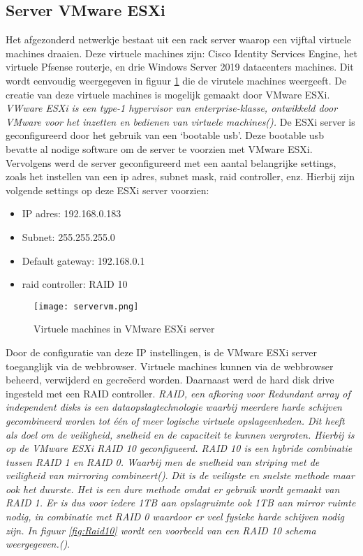 \subsection{Server VMware ESXi}
Het afgezonderd netwerkje bestaat uit een rack server waarop een vijftal virtuele machines draaien. Deze virtuele machines zijn: Cisco Identity Services Engine, het virtuele Pfsense routerje, en drie Windows Server 2019 datacenters machines. Dit wordt eenvoudig weergegeven in figuur \ref{fig:vms} die de virutele machines weergeeft. De creatie van deze virtuele machines is mogelijk gemaakt door VMware ESXi. \textit{VWware ESXi is een type-1 hypervisor van enterprise-klasse, ontwikkeld door VMware voor het inzetten en bedienen van virtuele machines(\cite{VMwareESXI}).} 
\newline
\newline
De ESXi server is geconfigureerd door het gebruik van een ‘bootable usb’. Deze bootable usb bevatte al nodige software om de server te voorzien met VMware ESXi. Vervolgens werd de server geconfigureerd met een aantal belangrijke settings, zoals het instellen van een ip adres, subnet mask, raid controller, enz. Hierbij zijn volgende settings op deze ESXi server voorzien: 

\begin{itemize}
	\item IP adres: 192.168.0.183
	\item Subnet: 255.255.255.0
	\item Default gateway: 192.168.0.1
	\item raid controller: RAID 10
\end{itemize}

\begin{figure}[H]
	\centering
	\texttt{[image: servervm.png]}
	\caption{Virtuele machines in VMware ESXi server}
	\label{fig:vms}
\end{figure}

\newpage
Door de configuratie van deze IP instellingen, is de VMware ESXi server toeganglijk via de webbrowser. Virtuele machines kunnen via de webbrowser beheerd, verwijderd en gecreëerd worden. Daarnaast werd de hard disk drive ingesteld met een RAID controller. \textit{RAID, een afkoring voor Redundant array of independent disks is een dataopslagtechnologie waarbij meerdere harde schijven gecombineerd worden tot één of meer logische virtuele opslageenheden. Dit heeft als doel om de veiligheid, snelheid en de capaciteit te kunnen vergroten. Hierbij is op de VMware ESXi RAID 10 geconfigueerd. RAID 10 is een hybride combinatie tussen RAID 1 en RAID 0. Waarbij men de snelheid van striping met de veiligheid van mirroring combineert(\cite{RAIDLi})}. 
\newline
\newline
\textit{Dit is de veiligste en snelste methode maar ook het duurste. Het is een dure methode omdat er gebruik wordt gemaakt van RAID 1. Er is dus voor iedere 1TB aan opslagruimte ook 1TB aan mirror ruimte nodig, in combinatie met RAID 0 waardoor er veel fysieke harde schijven nodig zijn. In figuur \ref{fig:Raid10} wordt een voorbeeld van een RAID 10 schema weergegeven.(\cite{RAIDLi})}.

